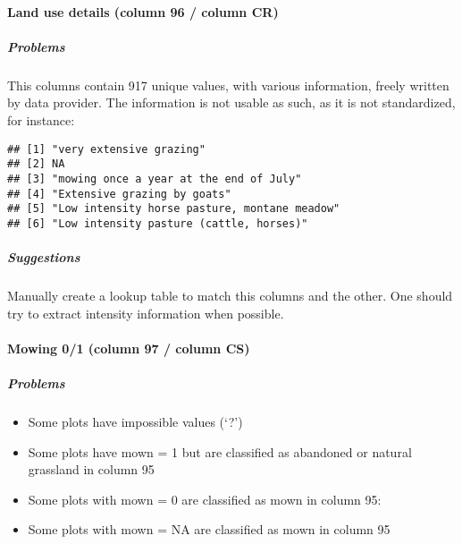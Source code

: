 \documentclass[table]{article}
\providecommand{\tightlist}{%
  \setlength{\itemsep}{0pt}\setlength{\parskip}{0pt}}
\let\oldparagraph\paragraph
\renewcommand{\paragraph}[1]{\oldparagraph{#1}\mbox{}}
\let\oldsubparagraph\subparagraph
\renewcommand{\subparagraph}[1]{\oldsubparagraph{#1}\mbox{}}
\begin{document}
\paragraph{Land use details (column 96 / column
CR)}\label{land-use-details-column-96-column-cr}

\subparagraph{\texorpdfstring{\emph{Problems}}{Problems}}\label{problems-1}

This columns contain 917 unique values, with various information, freely
written by data provider. The information is not usable as such, as it
is not standardized, for instance:

\begin{verbatim}
## [1] "very extensive grazing"                     
## [2] NA                                           
## [3] "mowing once a year at the end of July"      
## [4] "Extensive grazing by goats"                 
## [5] "Low intensity horse pasture, montane meadow"
## [6] "Low intensity pasture (cattle, horses)"
\end{verbatim}

\subparagraph{\texorpdfstring{\emph{Suggestions}}{Suggestions}}\label{suggestions-1}

Manually create a lookup table to match this columns and the other. One
should try to extract intensity information when possible.

\paragraph{Mowing 0/1 (column 97 / column
CS)}\label{mowing-01-column-97-column-cs}

\subparagraph{\texorpdfstring{\emph{Problems}}{Problems}}\label{problems-2}

\begin{itemize}
\tightlist
\item
  Some plots have impossible values (`?')
\item
  Some plots have mown = 1 but are classified as abandoned or natural
  grassland in column 95
\item
  Some plots with mown = 0 are classified as mown in column 95:
\item
  Some plots with mown = NA are classified as mown in column 95
\end{itemize}
\end{document}
